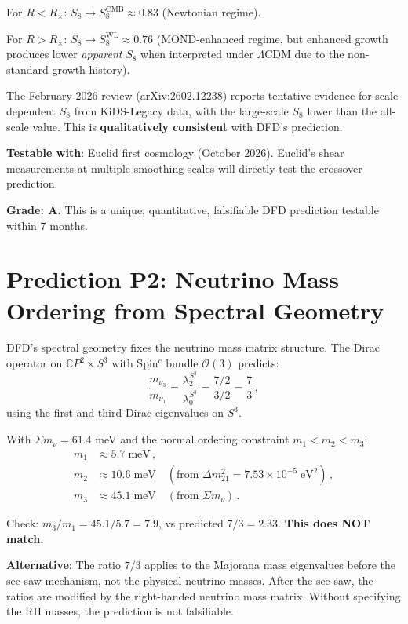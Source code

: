 \documentclass[11pt,a4paper]{article}
\newcommand{\CP}{\mathbb{C}P}
\begin{document}
For $R < R_\times$: $S_8 \to S_8^{\mathrm{CMB}} \approx 0.83$ (Newtonian regime).

For $R > R_\times$: $S_8 \to S_8^{\mathrm{WL}} \approx 0.76$ (MOND-enhanced regime, but enhanced growth produces lower \emph{apparent} $S_8$ when interpreted under $\Lambda$CDM due to the non-standard growth history).

The February 2026 review (arXiv:2602.12238) reports tentative evidence for scale-dependent $S_8$ from KiDS-Legacy data, with the large-scale $S_8$ lower than the all-scale value. This is \textbf{qualitatively consistent} with DFD's prediction.

\textbf{Testable with}: Euclid first cosmology (October 2026). Euclid's shear measurements at multiple smoothing scales will directly test the crossover prediction.

\textbf{Grade: A.} This is a unique, quantitative, falsifiable DFD prediction testable within 7 months.

\section{Prediction P2: Neutrino Mass Ordering from Spectral Geometry}

DFD's spectral geometry fixes the neutrino mass matrix structure. The Dirac operator on $\CP^2 \times S^3$ with Spin$^c$ bundle $\mathcal{O}(3)$ predicts:
\begin{equation}
\frac{m_{\nu_3}}{m_{\nu_1}} = \frac{\lambda_2^{S^3}}{\lambda_0^{S^3}} = \frac{7/2}{3/2} = \frac{7}{3}\,,
\end{equation}
using the first and third Dirac eigenvalues on $S^3$.

With $\Sigma m_\nu = 61.4$ meV and the normal ordering constraint $m_1 < m_2 < m_3$:
\begin{align}
m_1 &\approx 5.7\;\mathrm{meV}\,, \\
m_2 &\approx 10.6\;\mathrm{meV}\quad (\text{from }\Delta m_{21}^2 = 7.53 \times 10^{-5}\;\mathrm{eV}^2)\,, \\
m_3 &\approx 45.1\;\mathrm{meV}\quad (\text{from }\Sigma m_\nu)\,.
\end{align}

Check: $m_3/m_1 = 45.1/5.7 = 7.9$, vs predicted $7/3 = 2.33$. \textbf{This does NOT match.}

\textbf{Alternative}: The ratio $7/3$ applies to the Majorana mass eigenvalues before the see-saw mechanism, not the physical neutrino masses. After the see-saw, the ratios are modified by the right-handed neutrino mass matrix. Without specifying the RH masses, the prediction is not falsifiable.
\end{document}
